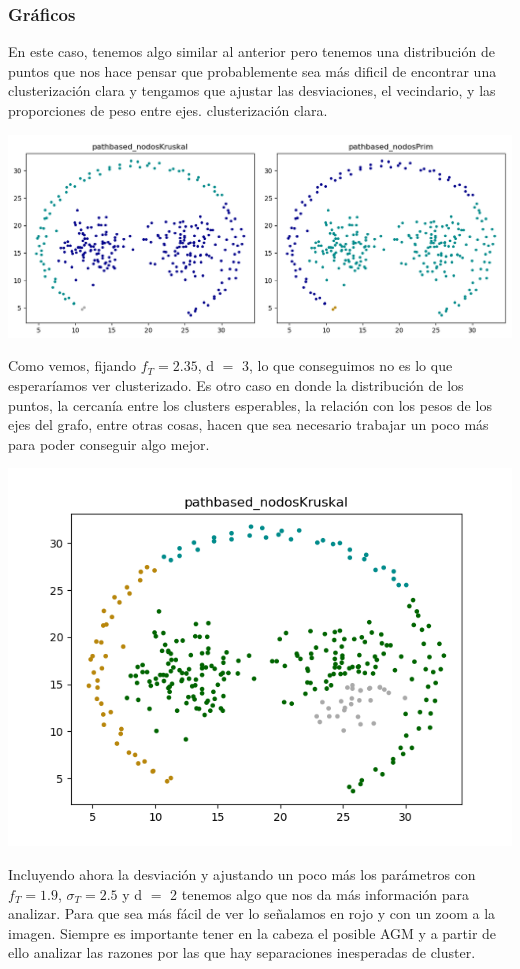 \documentclass[11pt,a4paper]{article}
\begin{document}
\subsubsection{Gráficos}
En este caso, tenemos algo similar al anterior pero tenemos una distribución de puntos que nos hace pensar que probablemente sea más dificil de encontrar una clusterización clara y tengamos que ajustar las desviaciones, el vecindario, y las proporciones de peso entre ejes. clusterización clara. 
\begin{center}
     \includegraphics[scale=.5]{graficos/pathbased_nodosKruskal_nodosPrim.png}
\end{center}

Como vemos, fijando $f_{T} = 2.35$, d $=$ 3, lo que conseguimos no es lo que esperaríamos ver clusterizado. Es otro caso en donde la distribución de los puntos, la cercanía entre los clusters esperables, la relación con los pesos de los ejes del grafo, entre otras cosas, hacen que sea necesario trabajar un poco más para poder conseguir algo mejor.

\begin{center}
\includegraphics[scale=.5]{graficos/pathbased_nodosKruskal3.png}
\end{center}
Incluyendo ahora la desviación y ajustando un poco más los parámetros con $f_{T} = 1.9$, $\sigma_{T} = 2.5$ y d $=$ 2 tenemos algo que nos da más información para analizar.
Para que sea más fácil de ver lo señalamos en rojo y con un zoom a la imagen. Siempre es importante tener en la cabeza el posible AGM y a partir de ello analizar las razones por las que hay separaciones inesperadas de cluster.
\end{document}
